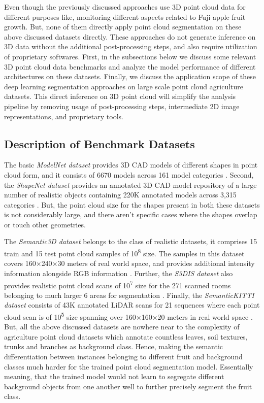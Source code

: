 \documentclass{article}
\begin{document}
Even though the previously discussed approaches use 3D point cloud data for different purposes like, monitoring different aspects related to Fuji apple fruit growth.
But, none of them directly apply point cloud segmentation on these above discussed datasets directly.
These approaches do not generate inference on 3D data without the additional post-processing steps, and also require utilization of proprietary softwares.
First, in the subsections below we discuss some relevant 3D point cloud data benchmarks and analyze the model performance of different architectures on these datasets.
Finally, we discuss the application scope of these deep learning segmentation approaches on large scale point cloud agriculture datasets.
This direct inference on 3D point cloud will simplify the analysis pipeline by removing usage of post-processing steps, intermediate 2D image representations, and proprietary tools.


\subsection{Description of Benchmark Datasets}


The basic \textit{ModelNet dataset} provides 3D CAD models of different shapes in point cloud form, and it consists of 6670 models across 161 model categories \cite{wu20153d}.
Second, the \textit{ShapeNet dataset} provides an annotated 3D CAD model repository of a large number of realistic objects containing 220K annotated models across 3,315 categories \cite{chang2015shapenet}.
But, the point cloud size for the shapes present in both these datasets is not considerably large, and there aren’t specific cases where the shapes overlap or touch other geometries.


The \textit{Semantic3D dataset} belongs to the class of realistic datasets, it comprises 15 train and 15 test point cloud samples of 10\textsuperscript{8} size.
The samples in this dataset covers 160$\times$240$\times$30 meters of real world space, and provides additional intensity information alongside RGB information \cite{hackel2017semantic3d}.
Further, the \textit{S3DIS dataset} also provides realistic point cloud scans of 10\textsuperscript{7} size for the 271 scanned rooms belonging to much larger 6 areas for segmentation \cite{armeni_cvpr16}.
Finally, the \textit{SemanticKITTI dataset} consists of 43K annotated LiDAR scans for 21 sequences where each point cloud scan is of 10\textsuperscript{5} size spanning over 160$\times$160$\times$20 meters in real world space \cite{behley2019semantickitti}.
But, all the above discussed datasets are nowhere near to the complexity of agriculture point cloud datasets which annotate countless leaves, soil textures, trunks and branches as background class.
Hence, making the semantic differentiation between instances belonging to different fruit and background classes much harder for the trained point cloud segmentation model.
Essentially meaning, that the trained model would not learn to segregate different background objects from one another well to further precisely segment the fruit class.
\end{document}
